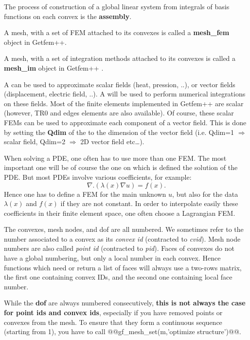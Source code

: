 The process of construction of a global linear system from integrals of basis
functions on each convex is the \textbf{assembly}.

A mesh, with a set of FEM attached to its
convexes is called a \textbf{mesh\_fem} object in Getfem++.

A mesh, with a set of integration methods attached to its
convexes is called a \textbf{mesh\_im} object in Getfem++ \NEW.

A \tmf can be used to approximate scalar fields (heat, pression, ..),
or vector fields (displacement, electric field, ..). A \tmim will be
used to perform numerical integrations on these fields.  Most of the
finite elements implemented in Getfem++ are scalar (however, TR0 and
edges elements are also available). Of course, these scalar FEMs can
be used to approximate each component of a vector field. This is done
by setting the \textbf{Qdim} of the \tmf to the dimension of the
vector field (i.e. Qdim=1 $\Rightarrow$ scalar field, Qdim=2 $\Rightarrow$ 2D vector field
etc\ldots).

When solving a PDE, one often has to use more than one FEM. The most important one will be of course the one on which is defined the solution of the PDE. But most PDEs involve various coefficients, for example:
\begin{equation*}
\nabla.(\lambda(x)\nabla u) = f(x).
\end{equation*}
Hence one has to define a FEM for the main unknown $u$, but also for the data $\lambda(x)$ and $f(x)$ if they are not constant. In order to interpolate easily these coefficients in their finite element space, one often choose a Lagrangian FEM.

The convexes, mesh nodes, and dof are all numbered. We sometimes refer to the
number associated to a convex as its \textit{convex id} (contracted to
\textit{cvid}). Mesh node numbers are also called \textit{point id} (contracted
to \textit{pid}). Faces of convexes do not have a global numbering, but only a local number in each convex. Hence functions which need or return a list of faces will always use a two-rows matrix, the first one containing convex IDs, and the second one containing local face number.

While the \textbf{dof} are always numbered consecutively, \textbf{this is not always the
  case for point ids and convex ids}, especially if you have removed points or
convexes from the mesh. To ensure that they form a continuous sequence
(starting from 1), you have to call @@gf_mesh_set(m,'optimize structure')@@.

